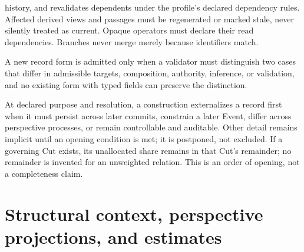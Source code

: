 \documentclass[11pt,a4paper]{article}
\begin{document}
\begin{description}
    history, and revalidates dependents under the profile's declared dependency
    rules. Affected derived views and passages must be regenerated or marked
    stale, never silently treated as current. Opaque operators must declare
    their read dependencies. Branches never merge merely because identifiers
    match.
  \item[A12 Core---Parsimony.] A new record form is admitted only when a validator
    must distinguish two cases that differ in admissible targets,
    composition, authority, inference, or validation, and no existing form
    with typed fields can preserve the distinction.
  \item[A13 Profile---Progressive externalization.] At declared purpose and resolution,
    a construction externalizes a record first when it must persist across later
    commits, constrain a later Event, differ across perspective processes, or remain controllable
    and auditable. Other detail remains implicit until an opening condition is
    met; it is postponed, not excluded. If a governing Cut exists, its
    unallocated share remains in that Cut's remainder; no remainder is invented
    for an unweighted relation. This is an order of opening, not a completeness
    claim.
\end{description}

\section{Structural context, perspective projections, and estimates}
\end{document}
